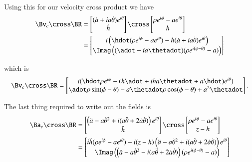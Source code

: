 {Using this for our velocity cross product we have
%
\begin{equation}\label{eqn:relativisticElectrodynamicsExamReflection:1310}
\begin{aligned}
\Bv_c \cross \BR
&=
\begin{bmatrix}
(\dot{a} + i a \dot{\theta}) e^{i\theta} \\
\dot{h}
\end{bmatrix}
\cross
\begin{bmatrix}
\rho e^{i\phi} - a e^{i\theta} \\
h
\end{bmatrix} \\
&=
\begin{bmatrix}
i\left(\hdot ( \rho e^{i\phi} - a e^{i\theta} ) - h (\dot{a} + i a \dot{\theta}) e^{i\theta} \right) \\
\Imag \left( ( \adot - i a \thetadot) (\rho e^{i(\phi - \theta)} - a) \right)
\end{bmatrix}
\end{aligned}
\end{equation}

which is
%
\begin{equation}\label{eqn:relativisticElectrodynamicsExamReflection:970}
\Bv_c \cross \BR
=
\begin{bmatrix}
i( \hdot \rho e^{i\phi} - (h \adot + i h a \thetadot + a \hdot) e^{i\theta} ) \\
\adot \rho \sin(\phi - \theta) - a \thetadot \rho \cos(\phi - \theta) + a^2 \thetadot
\end{bmatrix}.
\end{equation}

The last thing required to write out the fields is
%
\begin{equation}\label{eqn:relativisticElectrodynamicsExamReflection:1330}
\begin{aligned}
\Ba_c \cross \BR
&=
\begin{bmatrix}
\left( \ddot{a} - a {\dot{\theta}}^2 + i ( a\ddot{\theta} + 2 \dot{a} \dot{\theta} ) \right) e^{i\theta} \\
\ddot{h}
\end{bmatrix}
\cross
\begin{bmatrix}
\rho e^{i\phi} - a e^{i\theta} \\
z - h
\end{bmatrix} \\
&=
\begin{bmatrix}
i \ddot{h} (\rho e^{i\phi} - a e^{i\theta} ) - i (z - h) \left( \ddot{a} - a {\dot{\theta}}^2 + i ( a\ddot{\theta} + 2 \dot{a} \dot{\theta} ) \right) e^{i\theta} \\
\Imag \left(
\left( \ddot{a} - a {\dot{\theta}}^2 - i ( a\ddot{\theta} + 2 \dot{a} \dot{\theta} ) \right) ( \rho e^{i(\phi -\theta)} - a )
\right)
\end{bmatrix} \\
\end{aligned}
\end{equation}

}
